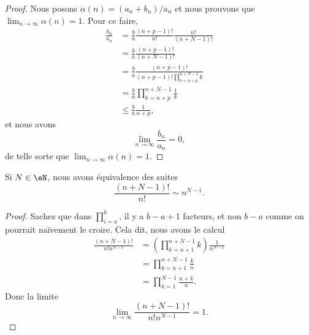 \begin{proof}
	Nous posons \( \alpha(n)=(a_n+b_n)/a_n\) et nous prouvons que \( \lim_{n\to \infty} \alpha(n)=1\). Pour ce faire,
	\begin{subequations}
		\begin{align}
			\frac{ b_n }{ a_n } & =\frac{ b }{ a }\frac{ (n+p-1)! }{ n! }\frac{ n! }{ (n+N-1)! }      \\
			                    & =\frac{ b }{ a }\frac{ (n+p-1)! }{ (n+N-1)! }                       \\
			                    & =\frac{ b }{ a }\frac{ (n+p-1)! }{ (n+p-1)!\prod_{k=n+p}^{n+N-1}k } \\
			                    & =\frac{ b }{ a }\prod_{k=n+p}^{n+N-1}\frac{1}{ k }                  \\
			                    & \leq \frac{ b }{ a }\frac{1}{ n+p },
		\end{align}
	\end{subequations}
	et nous avons
	\begin{equation}
		\lim_{n\to \infty} \frac{ b_n }{ a_n }=0,
	\end{equation}
	de telle sorte que \( \lim_{n\to \infty} \alpha(n)=1\).
\end{proof}

\begin{lemma}       \label{LEMooTGHHooZHZsgE}
	Si \( N\in \eN\), nous avons équivalence des suites
	\begin{equation}
		\frac{ (n+N-1)! }{ n! }\sim n^{N-1}.
	\end{equation}
\end{lemma}

\begin{proof}
	Sachez que dans \( \prod_{i=a}^b\), il y a \( b-a+1\) facteurs, et non \( b-a\) comme on pourrait naïvement le croire. Cela dit, nous avons le calcul
	\begin{subequations}
		\begin{align}
			\frac{ (n+N-1)! }{ n!n^{N-1} } & =\left( \prod_{k=n+1}^{n+N-1}k \right)\frac{1}{ n^{N-1} } \\
			                               & =\prod_{k=n+1}^{n+N-1}\frac{ k }{ n }                     \\
			                               & =\prod_{k=1}^{N-1}\frac{ n+k }{ n }.
		\end{align}
	\end{subequations}
	Donc la limite
	\begin{equation}
		\lim_{n\to \infty} \frac{ (n+N-1)! }{ n!n^{N-1} }=1.
	\end{equation}
\end{proof}

